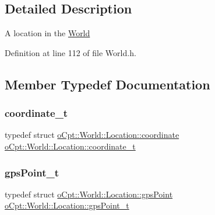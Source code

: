 \subsection{Detailed Description}
A location in the \hyperlink{classo_cpt_1_1_world}{World} 

Definition at line 112 of file World.\+h.



\subsection{Member Typedef Documentation}
\hypertarget{classo_cpt_1_1_world_1_1_location_ade9263a17c41b7af085dfcb9055b18f3}{}\label{classo_cpt_1_1_world_1_1_location_ade9263a17c41b7af085dfcb9055b18f3} 
\subsubsection{\texorpdfstring{coordinate\+\_\+t}{coordinate\_t}}
{\footnotesize\ttfamily typedef struct \hyperlink{structo_cpt_1_1_world_1_1_location_1_1coordinate}{o\+Cpt\+::\+World\+::\+Location\+::coordinate}  \hyperlink{classo_cpt_1_1_world_1_1_location_ade9263a17c41b7af085dfcb9055b18f3}{o\+Cpt\+::\+World\+::\+Location\+::coordinate\+\_\+t}}

\hypertarget{classo_cpt_1_1_world_1_1_location_a3aa5e31e2888b4da40ad534b99473888}{}\label{classo_cpt_1_1_world_1_1_location_a3aa5e31e2888b4da40ad534b99473888} 
\subsubsection{\texorpdfstring{gps\+Point\+\_\+t}{gpsPoint\_t}}
{\footnotesize\ttfamily typedef struct \hyperlink{structo_cpt_1_1_world_1_1_location_1_1gps_point}{o\+Cpt\+::\+World\+::\+Location\+::gps\+Point}  \hyperlink{classo_cpt_1_1_world_1_1_location_a3aa5e31e2888b4da40ad534b99473888}{o\+Cpt\+::\+World\+::\+Location\+::gps\+Point\+\_\+t}}

\hypertarget{classo_cpt_1_1_world_1_1_location_a33b7d6b8797958b6e4d792dfeaa6d160}{}\label{classo_cpt_1_1_world_1_1_location_a33b7d6b8797958b6e4d792dfeaa6d160} 
